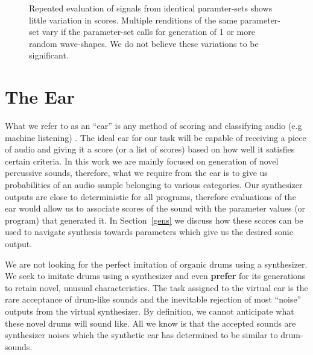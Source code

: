 \documentclass[\main/thesis.tex]{subfiles}
\begin{document}
\begin{figure}[htbp!]
\begin{center}
{{    }}
\end{center}

\caption{Repeated evaluation of signals from identical paramter-sets shows little variation in scores. Multiple renditions of the same parameter-set vary if the parameter-set calls for generation of 1 or more random wave-shapes. We do not believe these variations to be significant.}
\label{fig:synth_deterministic}
\end{figure}


\section{The Ear}
What we refer to as an \enquote{ear} is any method of scoring and classifying audio (e.g machine listening) \cite{malkin2006machine,rowe1992interactive}. The ideal ear for our task will be capable of receiving a piece of audio and giving it a score (or a list of scores) based on how well it satisfies certain criteria. In this work we are mainly focused on generation of novel percussive sounds, therefore, what we require from the ear is to give us probabilities of an audio sample belonging to various categories. Our synthesizer outputs are close to deterministic for all programs, therefore evaluations of the ear would allow us to associate scores of the sound with the parameter values (or program) that generated it. In Section~\ref{gens} we discuss how these scores can be used to navigate synthesis towards parameters which give us the desired sonic output.

We are not looking for the perfect imitation of organic drums using a synthesizer. We seek to imitate drums using a synthesizer and even \textbf{prefer} for its generations to retain novel, unusual characteristics. The task assigned to the virtual ear is the rare acceptance of drum-like sounds and the inevitable rejection of most \enquote{noise} outputs from the virtual synthesizer. By definition, we cannot anticipate what these novel drums will sound like. All we know is that the accepted sounds are synthesizer noises which the synthetic ear has determined to be similar to drum-sounds. 
\end{document}
